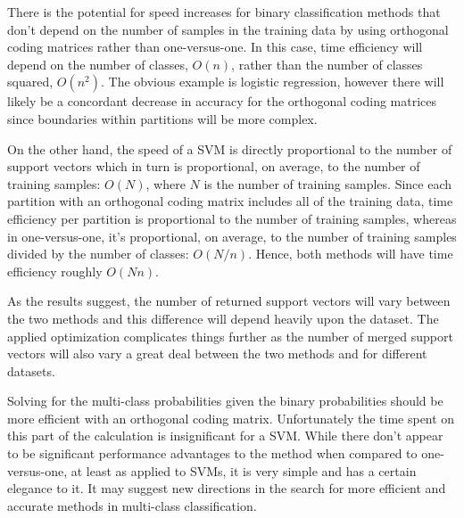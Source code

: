 There is the potential for speed increases for binary classification methods
that don't depend on the number of samples in the training data by using
orthogonal coding matrices rather than one-versus-one.
In this case, time efficiency will depend on the number of classes,
$O(n)$, rather than the number of classes squared, $O(n^2)$.
The obvious example is logistic regression, however there will likely be
a concordant decrease in accuracy for the orthogonal coding matrices since
boundaries within partitions will be more complex.

On the other hand, the speed of a SVM is directly proportional to the number 
of support vectors which in turn is proportional, on average,
to the number of training samples: 
$O(N)$, where $N$ is the number of training samples.
Since each partition with an orthogonal coding matrix includes all of the
training data, time efficiency per partition is proportional to the number
of training samples, whereas in one-versus-one, it's proportional, on average,
to the number of training samples divided by the number of classes: $O(N/n)$.
Hence, both methods will have time efficiency roughly $O(Nn)$.

As the results suggest, the number of returned support vectors will vary 
between the two methods and this difference will depend heavily upon the 
dataset.
The applied optimization complicates things further as the number of merged
support vectors will also vary a great deal between the two methods and
for different datasets.

Solving for the multi-class probabilities given the binary probabilities should
be more efficient with an orthogonal coding matrix. 
Unfortunately the time
spent on this part of the calculation is insignificant for a SVM.
While there don't appear to be significant performance advantages to the method
when compared to one-versus-one, at least as applied to SVMs, 
it is very simple and has a certain elegance to it.
It may suggest new directions in the search for more efficient and
accurate methods in multi-class classification.

